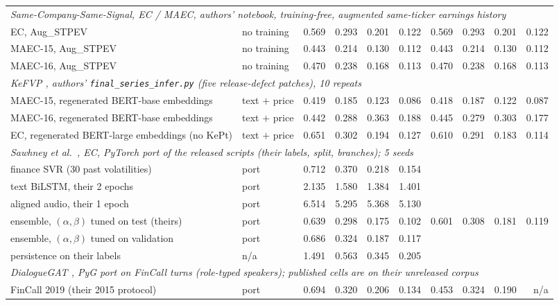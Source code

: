 \begin{table}[t]
\begin{tabular}{llrrrrrrrr}
\multicolumn{10}{l}{\textit{Same-Company-Same-Signal, EC / MAEC, authors' notebook, training-free, augmented same-ticker earnings history}} \\
\quad EC, Aug\_STPEV & no training & 0.569 & 0.293 & 0.201 & 0.122 & 0.569 & 0.293 & 0.201 & 0.122 \\
\quad MAEC-15, Aug\_STPEV & no training & 0.443 & 0.214 & 0.130 & 0.112 & 0.443 & 0.214 & 0.130 & 0.112 \\
\quad MAEC-16, Aug\_STPEV & no training & 0.470 & 0.238 & 0.168 & 0.113 & 0.470 & 0.238 & 0.168 & 0.113 \\
\midrule
\multicolumn{10}{l}{\textit{KeFVP \citep{niu2023kefvp}, authors' \texttt{final\_series\_infer.py} (five release-defect patches), 10 repeats}} \\
\quad MAEC-15, regenerated BERT-base embeddings & text $+$ price & 0.419 & 0.185 & 0.123 & 0.086 & 0.418 & 0.187 & 0.122 & 0.087 \\
\quad MAEC-16, regenerated BERT-base embeddings & text $+$ price & 0.442 & 0.288 & 0.363 & 0.188 & 0.445 & 0.279 & 0.303 & 0.177 \\
\quad EC, regenerated BERT-large embeddings (no KePt) & text $+$ price & 0.651 & 0.302 & 0.194 & 0.127 & 0.610 & 0.291 & 0.183 & 0.114 \\
\midrule
\multicolumn{10}{l}{\textit{Sawhney et al.\ \citeyearpar{sawhney2020mm}, EC, PyTorch port of the released scripts (their labels, split, branches); 5 seeds}} \\
\quad finance SVR (30 past volatilities) & port & 0.712 & 0.370 & 0.218 & 0.154 & & & & \\
\quad text BiLSTM, their 2 epochs & port & 2.135 & 1.580 & 1.384 & 1.401 & & & & \\
\quad aligned audio, their 1 epoch & port & 6.514 & 5.295 & 5.368 & 5.130 & & & & \\
\quad ensemble, $(\alpha,\beta)$ tuned on test (theirs) & port & 0.639 & 0.298 & 0.175 & 0.102 & 0.601 & 0.308 & 0.181 & 0.119 \\
\quad ensemble, $(\alpha,\beta)$ tuned on validation & port & 0.686 & 0.324 & 0.187 & 0.117 & & & & \\
\quad persistence on their labels & n/a & 1.491 & 0.563 & 0.345 & 0.205 & & & & \\
\midrule
\multicolumn{10}{l}{\textit{DialogueGAT \citep{sang2022dialoguegat}, PyG port on FinCall turns (role-typed speakers); published cells are on their unreleased corpus}} \\
\quad FinCall 2019 (their 2015 protocol) & port & 0.694 & 0.320 & 0.206 & 0.134 & 0.453 & 0.324 & 0.190 & n/a \\

\end{tabular}
\end{table}
